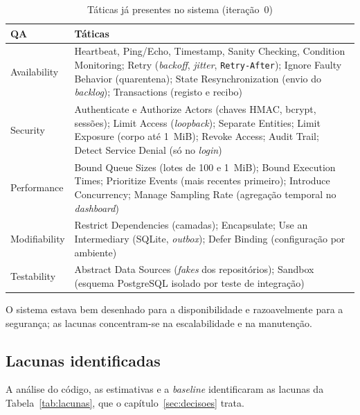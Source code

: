 \begin{table}[htbp]
  \centering\small
  \caption{Táticas já presentes no sistema (iteração~0)}
  \label{tab:tacticas-existentes}
  \begin{tabularx}{\linewidth}{lY}
    \toprule
    QA & Táticas \\
    \midrule
    Availability & Heartbeat, Ping/Echo, Timestamp, Sanity Checking, Condition Monitoring; Retry (\emph{backoff}, \emph{jitter}, \texttt{Retry-After}); Ignore Faulty Behavior (quarentena); State Resynchronization (envio do \emph{backlog}); Transactions (registo e recibo) \\
    Security & Authenticate e Authorize Actors (chaves HMAC, bcrypt, sessões); Limit Access (\emph{loopback}); Separate Entities; Limit Exposure (corpo até 1~MiB); Revoke Access; Audit Trail; Detect Service Denial (só no \emph{login}) \\
    Performance & Bound Queue Sizes (lotes de 100 e 1~MiB); Bound Execution Times; Prioritize Events (mais recentes primeiro); Introduce Concurrency; Manage Sampling Rate (agregação temporal no \emph{dashboard}) \\
    Modifiability & Restrict Dependencies (camadas); Encapsulate; Use an Intermediary (SQLite, \emph{outbox}); Defer Binding (configuração por ambiente) \\
    Testability & Abstract Data Sources (\emph{fakes} dos repositórios); Sandbox (esquema PostgreSQL isolado por teste de integração) \\
    \bottomrule
  \end{tabularx}
\end{table}

O sistema estava bem desenhado para a disponibilidade e razoavelmente para a segurança; as lacunas concentram-se
na escalabilidade e na manutenção.

\subsection{Lacunas identificadas}
\label{sec:lacunas}

A análise do código, as estimativas e a \emph{baseline} identificaram as lacunas da Tabela~\ref{tab:lacunas}, que o
capítulo~\ref{sec:decisoes} trata.


